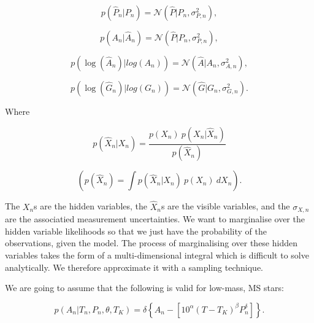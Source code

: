 \documentclass[12pt,preprint]{aastex}
\begin{document}
\begin{equation}
p(\hat{P}_n|P_n) = \mathcal{N}(\hat{P}|P_n, \sigma^2_{P,n}),
\label{eq:p2}
\end{equation}

\begin{equation}
p(A_n|\hat{A}_n) = \mathcal{N}(\hat{P}|P_n, \sigma^2_{P,n}),
\label{eq:p2}
\end{equation}

\begin{equation}
p(\log(\hat{A}_n)|log(A_n)) = \mathcal{N}(\hat{A}|A_n, \sigma^2_{A,n}),
\label{eq:p3}
\end{equation}

\begin{equation}
p(\log(\hat{G}_n)|log(G_n)) = \mathcal{N}(\hat{G}|G_n, \sigma^2_{G,n}).
\label{eq:p4}
\end{equation}

Where

\begin{equation}
	p(\hat{X}_n|X_n) = \frac{p(X_n)~p(X_n|\hat{X}_n)}{p(\hat{X}_n)}
\label{eq:post_def}
\end{equation}

\begin{equation}
	\left(p(\hat{X}_n) = \int{p(\hat{X}_n|X_n)~p(X_n)~dX_n}\right).
\end{equation}

The $X_n$s are the hidden variables, the $\hat{X}_n$s are the visible variables, and the $\sigma_{X,n}$ are the associatied measurement uncertainties.
We want to marginalise over the hidden variable likelihoods so that we just have the probability of the observations, given the model.
The process of marginalising over these hidden variables takes the form of a multi-dimensional integral which is difficult to solve analytically.
We therefore approximate it with a sampling technique.

We are going to assume that the following is valid for low-mass, MS stars:

\begin{equation}
p(A_n|T_n,P_n,\theta,T_K) = \delta \left\{ A_n - \left[ 10^\alpha \left(T-T_K \right)^\beta P_n^\delta \right] \right\}.
\end{equation}
\end{document}
